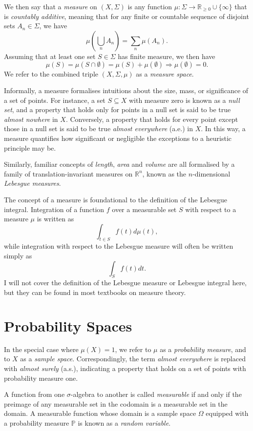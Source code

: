 \documentclass[honours,12pt]{unswthesis}
\def\implies{\Rightarrow}
\numberwithin{equation}{section}
\begin{document}
We then say that a \textit{measure} on $(X,\Sigma)$ is any function $\mu:\Sigma\to\mathbb{R}_{\geq 0}\cup\{\infty\}$ that is \textit{countably additive}, meaning that for any finite or countable sequence of disjoint sets $A_n\in\Sigma$, we have
$$\mu\left(\bigcup_n A_n\right) = \sum_n \mu(A_n).$$
Assuming that at least one set $S\in\Sigma$ has finite measure, we then have $$\mu(S)=\mu(S\cap\emptyset)=\mu(S)+\mu(\emptyset) \implies \mu(\emptyset)=0.$$
We refer to the combined triple $(X,\Sigma,\mu)$ as a \textit{measure space}.

Informally, a measure formalises intuitions about the size, mass, or significance of a set of points. For instance, a set $S\subseteq X$ with measure zero is known as a \textit{null set}, and a property that holds only for points in a null set is said to be true \textit{almost nowhere} in $X$. Conversely, a property that holds for every point except those in a null set is said to be true \textit{almost everywhere} (a.e.) in $X$. In this way, a measure quantifies how significant or negligible the exceptions to a heuristic principle may be.

Similarly, familiar concepts of \textit{length}, \textit{area} and \textit{volume} are all formalised by a family of translation-invariant measures on $\mathbb{R}^n$, known as the $n$-dimensional \textit{Lebesgue measures}.

The concept of a measure is foundational to the definition of the Lebesgue integral. Integration of a function $f$ over a measurable set $S$ with respect to a measure $\mu$ is written as
$$\int_{t\in S} f(t) d\mu(t),$$
while integration with respect to the Lebesgue measure will often be written simply as
$$\int_S f(t)dt.$$
I will not cover the definition of the Lebesgue measure or Lebesgue integral here, but they can be found in most textbooks on measure theory.

\section{Probability Spaces}
In the special case where $\mu(X)=1$, we refer to $\mu$ as a \textit{probability measure}, and to $X$ as a \textit{sample space}. Correspondingly, the term \textit{almost everywhere} is replaced with \textit{almost surely} (a.s.), indicating a property that holds on a set of points with probability measure one.

A function from one $\sigma$-algebra to another is called \textit{measurable} if and only if the preimage of any measurable set in the codomain is a measurable set in the domain. A measurable function whose domain is a sample space $\Omega$ equipped with a probability measure $\mathbb{P}$ is known as a \textit{random variable}.
\end{document}
